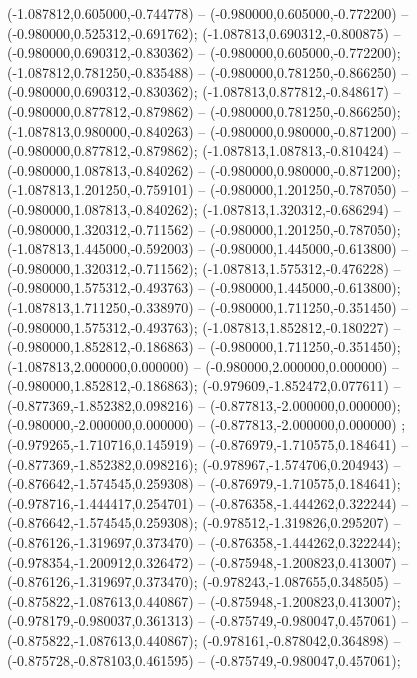  (-1.087812,0.605000,-0.744778) -- (-0.980000,0.605000,-0.772200) -- (-0.980000,0.525312,-0.691762);
 (-1.087813,0.690312,-0.800875) -- (-0.980000,0.690312,-0.830362) -- (-0.980000,0.605000,-0.772200);
 (-1.087812,0.781250,-0.835488) -- (-0.980000,0.781250,-0.866250) -- (-0.980000,0.690312,-0.830362);
 (-1.087813,0.877812,-0.848617) -- (-0.980000,0.877812,-0.879862) -- (-0.980000,0.781250,-0.866250);
 (-1.087813,0.980000,-0.840263) -- (-0.980000,0.980000,-0.871200) -- (-0.980000,0.877812,-0.879862);
 (-1.087813,1.087813,-0.810424) -- (-0.980000,1.087813,-0.840262) -- (-0.980000,0.980000,-0.871200);
 (-1.087813,1.201250,-0.759101) -- (-0.980000,1.201250,-0.787050) -- (-0.980000,1.087813,-0.840262);
 (-1.087813,1.320312,-0.686294) -- (-0.980000,1.320312,-0.711562) -- (-0.980000,1.201250,-0.787050);
 (-1.087813,1.445000,-0.592003) -- (-0.980000,1.445000,-0.613800) -- (-0.980000,1.320312,-0.711562);
 (-1.087813,1.575312,-0.476228) -- (-0.980000,1.575312,-0.493763) -- (-0.980000,1.445000,-0.613800);
 (-1.087813,1.711250,-0.338970) -- (-0.980000,1.711250,-0.351450) -- (-0.980000,1.575312,-0.493763);
 (-1.087813,1.852812,-0.180227) -- (-0.980000,1.852812,-0.186863) -- (-0.980000,1.711250,-0.351450);
 (-1.087813,2.000000,0.000000) -- (-0.980000,2.000000,0.000000) -- (-0.980000,1.852812,-0.186863);
 (-0.979609,-1.852472,0.077611) -- (-0.877369,-1.852382,0.098216) -- (-0.877813,-2.000000,0.000000);
 (-0.980000,-2.000000,0.000000) -- (-0.877813,-2.000000,0.000000) ;
 (-0.979265,-1.710716,0.145919) -- (-0.876979,-1.710575,0.184641) -- (-0.877369,-1.852382,0.098216);
 (-0.978967,-1.574706,0.204943) -- (-0.876642,-1.574545,0.259308) -- (-0.876979,-1.710575,0.184641);
 (-0.978716,-1.444417,0.254701) -- (-0.876358,-1.444262,0.322244) -- (-0.876642,-1.574545,0.259308);
 (-0.978512,-1.319826,0.295207) -- (-0.876126,-1.319697,0.373470) -- (-0.876358,-1.444262,0.322244);
 (-0.978354,-1.200912,0.326472) -- (-0.875948,-1.200823,0.413007) -- (-0.876126,-1.319697,0.373470);
 (-0.978243,-1.087655,0.348505) -- (-0.875822,-1.087613,0.440867) -- (-0.875948,-1.200823,0.413007);
 (-0.978179,-0.980037,0.361313) -- (-0.875749,-0.980047,0.457061) -- (-0.875822,-1.087613,0.440867);
 (-0.978161,-0.878042,0.364898) -- (-0.875728,-0.878103,0.461595) -- (-0.875749,-0.980047,0.457061);

